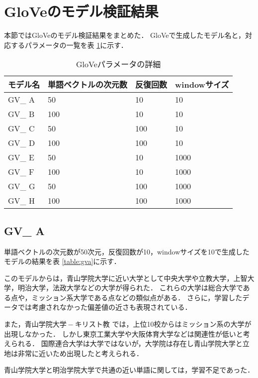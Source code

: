 \section{GloVeのモデル検証結果}
本節ではGloVeのモデル検証結果をまとめた．
GloVeで生成したモデル名と，対応するパラメータの一覧を表 \ref{table:gvResultAll}に示す．

\begin{table}[htbp]
\caption{GloVeパラメータの詳細}
\centering
\begin{tabular}{llll}
\hline
モデル名 & 単語ベクトルの次元数 & 反復回数 & windowサイズ
\\ \hline \hline
GV\_ A & 50 & 10 & 10\\ \hline
GV\_ B & 100 & 10 & 10\\ \hline
GV\_ C & 50 & 100 & 10\\ \hline
GV\_ D & 100 & 100 & 10\\ \hline
GV\_ E & 50 & 10 & 1000\\ \hline
GV\_ F & 100 & 10 & 1000\\ \hline
GV\_ G & 50 & 100 & 1000\\ \hline
GV\_ H & 100 & 100 & 1000\\ \hline
\end{tabular}
\label{table:gvResultAll}
\end{table}

\subsection{GV\_ A}
単語ベクトルの次元数が50次元，反復回数が10，windowサイズを10で生成したモデルの結果を表 \ref{table:gva}に示す．

このモデルからは，青山学院大学に近い大学として中央大学や立教大学，上智大学，明治大学，法政大学などの大学が得られた．
これらの大学は総合大学である点や，ミッション系大学である点などの類似点がある．
さらに，学習したデータでは考慮されなかった偏差値の近さも表現されている．

また，$ 青山学院大学 - キリスト教 $ では，上位10校からはミッション系の大学が出現しなかった．
しかし東京工業大学や大阪体育大学などは関連性が低いと考えられる．
国際連合大学は大学ではないが，大学院は存在し青山学院大学と立地は非常に近いため出現したと考えられる．

青山学院大学と明治学院大学で共通の近い単語に関しては，学習不足であった．

